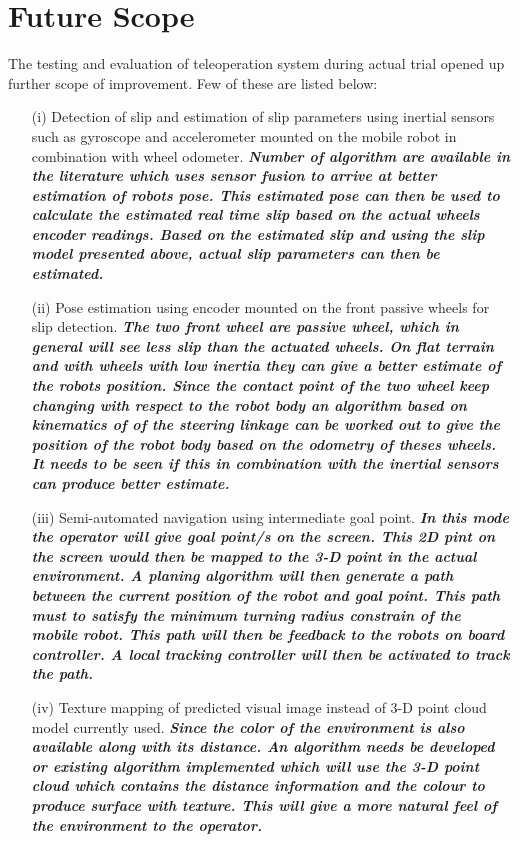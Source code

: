\section{Future Scope }
The testing and evaluation of teleoperation system during actual trial opened up  further scope of improvement. Few of these are listed below:  
\begin{itemize}
	\item [(i)] Detection of slip and estimation of slip parameters using inertial sensors such as gyroscope and accelerometer  mounted on the mobile robot  in combination with wheel odometer.  \textbf{\textit{ Number of algorithm are available in the literature which uses sensor fusion to arrive at better estimation of robots pose. This estimated pose can then be used to calculate the estimated real time slip based on the actual wheels encoder readings. Based on the estimated slip and using the slip model presented above, actual slip parameters can then be estimated.  }}
	
	\item[(ii)]  Pose estimation using encoder mounted on the front passive wheels for slip detection. \textbf{\textit{The two front wheel are passive wheel, which in general will see less slip than the actuated wheels. On flat terrain and with wheels with low inertia they can give a better estimate of the robots position. Since the contact point of the two wheel keep changing with respect to the robot body an algorithm based on kinematics of of the steering linkage can be worked out to give the position of the robot body based on the odometry of theses wheels. It needs to be seen if this in combination with the  inertial sensors can produce better estimate. }}
	
	\item[(iii)] Semi-automated navigation using intermediate goal point. \textbf{\textit{ In this mode the operator will give goal point/s on the screen. This 2D pint on the screen would then be mapped to the 3-D point in the actual environment. A planing algorithm will then generate a path between the current position of the robot and goal point. This path must to satisfy the minimum turning radius constrain of the mobile robot. This path will then be feedback to the robots on board controller. A local tracking controller will then be activated to track the path.}} 
	
	\item[(iv)] Texture mapping of predicted  visual image instead of 3-D point cloud model currently used. \textbf{\textit{Since the color of the environment is also available along with its distance. An algorithm needs be  developed or existing algorithm implemented   which will use the 3-D point cloud which contains the distance information  and the colour to produce surface with texture.  This will give a more natural feel of the environment to the operator.}}
	

\end{itemize}
